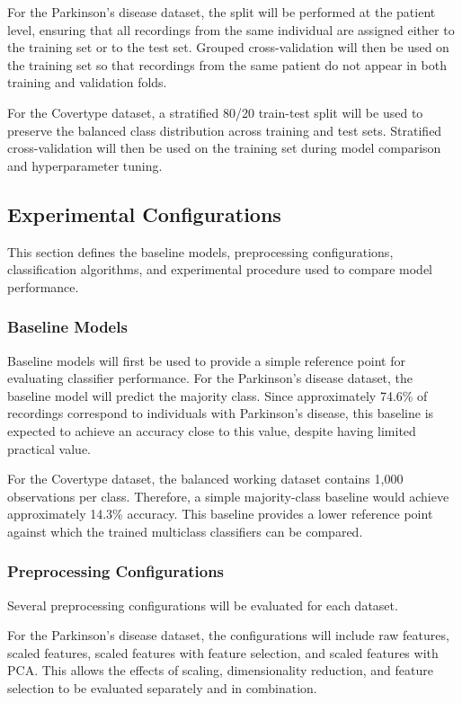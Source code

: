 \documentclass[11pt,a4paper]{article}
\begin{document}
For the Parkinson's disease dataset, the split will be performed at the
patient level, ensuring that all recordings from the same individual are
assigned either to the training set or to the test set. Grouped
cross-validation will then be used on the training set so that recordings from
the same patient do not appear in both training and validation folds.

For the Covertype dataset, a stratified 80/20 train-test split will be used to
preserve the balanced class distribution across training and test sets.
Stratified cross-validation will then be used on the training set during model
comparison and hyperparameter tuning.

\subsection{Experimental Configurations}

This section defines the baseline models, preprocessing configurations,
classification algorithms, and experimental procedure used to compare model
performance.

\subsubsection{Baseline Models}

Baseline models will first be used to provide a simple reference point for
evaluating classifier performance. For the Parkinson's disease dataset, the
baseline model will predict the majority class. Since approximately 74.6\% of
recordings correspond to individuals with Parkinson's disease, this baseline
is expected to achieve an accuracy close to this value, despite having limited
practical value.

For the Covertype dataset, the balanced working dataset contains 1{,}000
observations per class. Therefore, a simple majority-class baseline would
achieve approximately 14.3\% accuracy. This baseline provides a lower
reference point against which the trained multiclass classifiers can be
compared.

\subsubsection{Preprocessing Configurations}

Several preprocessing configurations will be evaluated for each dataset.

For the Parkinson's disease dataset, the configurations will include raw
features, scaled features, scaled features with feature selection, and scaled
features with PCA. This allows the effects of scaling, dimensionality
reduction, and feature selection to be evaluated separately and in
combination.
\end{document}
